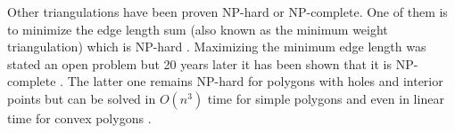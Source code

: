 Other triangulations have been proven NP-hard or NP-complete. One
of them is to minimize the edge length sum (also known as the minimum
weight triangulation) which is NP-hard \cite{mwt_complexity}. 
Maximizing the minimum edge length was stated an open problem
\cite{triangulation_minmax_length} but 20 years later it has been
shown that it is NP-complete \cite{mmlt_complexity}. The latter one
remains NP-hard for polygons with holes and interior points
\cite{mmlt_polygons} but can be solved in \(O(n^3)\) time for simple
polygons and even in linear time for convex polygons
\cite{mmlt_convex_polygons}.

